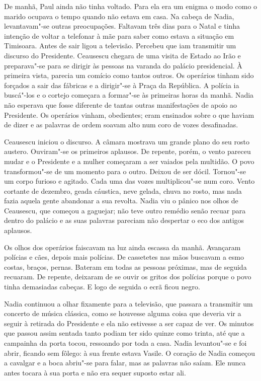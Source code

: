 De manhã, Paul ainda não tinha voltado. Para ela era um enigma o modo
como o marido ocupava o tempo quando não estava em casa. Na cabeça de
Nadia, levantavam"-se outras preocupações. Faltavam três dias para o
Natal e tinha intenção de voltar a telefonar à mãe para saber como
estava a situação em Timisoara. Antes de sair ligou a televisão.
Percebeu que iam transmitir um discurso do Presidente. Ceausescu chegara
de uma visita de Estado ao Irão e preparava"-se para se dirigir às
pessoas na varanda do palácio presidencial. À primeira vista, parecia um
comício como tantos outros. Os operários tinham sido forçados a sair
das fábricas e a dirigir"-se à Praça da República. A polícia ia buscá"-los
e o cortejo começara a formar"-se às primeiras horas da manhã. Nadia não
esperava que fosse diferente de tantas outras manifestações de apoio ao
Presidente. Os operários vinham, obedientes; eram ensinados sobre o
que haviam de dizer e as palavras de ordem soavam alto num coro de
vozes desafinadas.

Ceausescu iniciou o discurso. A câmara mostrava um
grande plano do seu rosto austero. Ouviram"-se os primeiros aplausos.
De repente, porém, o vento pareceu mudar e o Presidente e a mulher
começaram a ser vaiados pela multidão. O povo transformou"-se de um
momento para o outro. Deixou de ser dócil. Tornou"-se um corpo furioso e
agitado. Cada uma das vozes multiplicou"-se num coro. Vento cortante de
dezembro, geada cáustica, neve gelada, chuva no rosto, mas nada fazia
aquela gente abandonar a sua revolta. Nadia viu o pânico nos olhos de
Ceausescu,
que começou a gaguejar; não teve outro remédio senão recuar para dentro
do palácio e as suas palavras pareciam não despertar o eco dos antigos
aplausos.

Os olhos dos operários faiscavam na luz ainda escassa da manhã.
Avançaram polícias e cães, depois mais polícias. De cassetetes nas mãos
buscavam a esmo costas, braços, pernas. Bateram em todas as pessoas
próximas, mas de seguida recuaram. De repente, deixaram de se ouvir os
gritos dos polícias porque o povo tinha demasiadas cabeças. E logo de
seguida o ecrã ficou negro.

Nadia continuou a olhar fixamente para a televisão, que passara a
transmitir um concerto de música clássica, como se houvesse alguma coisa
que deveria vir a seguir à retirada do Presidente e ela não estivesse a
ser capaz de ver. Os minutos que passou assim sentada tanto podiam ter
sido quinze como trinta, até que a campainha da porta tocou, ressoando
por toda a casa. Nadia levantou"-se e foi abrir, ficando sem fôlego: à sua frente estava Vasile. O
coração de Nadia começou a cavalgar e a boca abriu"-se para falar, mas as
palavras não saíam. Ele nunca antes tocara à sua porta e não era sequer
suposto estar ali.

